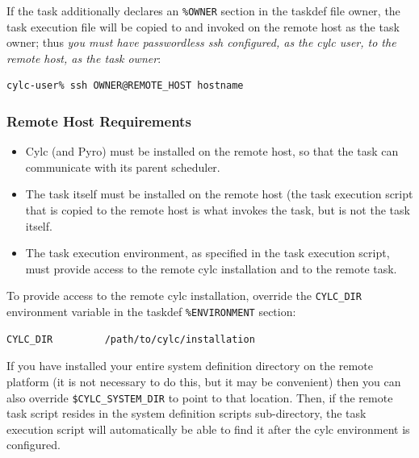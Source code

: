 \documentclass[11pt,a4paper]{article}
\begin{document}
If the task additionally declares an \lstinline=%OWNER= section in the
taskdef file owner, the task execution file will be copied to and
invoked on the remote host as the task owner; thus {\em you must have
passwordless ssh configured, as the cylc user, to the remote host, as
the task owner}:

\begin{lstlisting}
cylc-user% ssh OWNER@REMOTE_HOST hostname
\end{lstlisting}


\subsubsection{Remote Host Requirements}

\begin{itemize}

    \item Cylc (and Pyro) must be installed on the remote host, so that 
        the task can communicate with its parent scheduler.
        
    \item The task itself must be installed on the remote host (the task
        execution script that is copied to the remote host is what
        invokes the task, but is not the task itself. 

    \item The task execution environment, as specified in the task
        execution script, must provide access to the remote cylc
        installation and to the remote task.

\end{itemize}

\lstset{language=cylctaskdef}

To provide access to the remote cylc installation, override the 
\lstinline=CYLC_DIR= environment variable in the taskdef
\lstinline=%ENVIRONMENT= section:

\begin{lstlisting}
CYLC_DIR         /path/to/cylc/installation
\end{lstlisting}

If you have installed your entire system definition directory on the
remote platform (it is not necessary to do this, but it may be
convenient) then you can also override \lstinline=$CYLC_SYSTEM_DIR= to
point to that location. Then, if the remote task script resides in the
system definition scripts sub-directory, the task execution script will
automatically be able to find it after the cylc environment is
configured.
\end{document}
